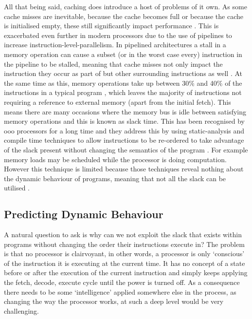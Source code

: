 All that being said, caching does introduce a host of problems of it own. As some cache misses are inevitable, because the cache becomes full or because the cache is initialised empty, these still significantly impact performance \cite{al-zoubiPerformanceEvaluationCache2004}. This is exacerbated even further in modern processors due to the use of pipelines to increase instruction-level-parallelism. In pipelined architectures a stall in a memory operation can cause a subset (or in the worst case every) instruction in the pipeline to be stalled, meaning that cache misses not only impact the instruction they occur as part of but other surrounding instructions as well \cite{pattersonComputerOrganizationDesign2018}. At the same time as this, memory operations take up between 30\% and 40\% of the instructions in a typical program \cite{bieniaPARSECBenchmarkSuite2008, limayeWorkloadCharacterizationSPEC2018}, which leaves the majority of instructions not requiring a reference to external memory (apart from the initial fetch). This means there are many occasions where the memory bus is idle between satisfying memory operations and this is known as slack time. This has been recognised by \gls{ooo} processors for a long time and they address this by using static-analysis and compile time techniques to allow instructions to be re-ordered to take advantage of the slack present without changing the semantics of the program \cite{hennessyComputerArchitectureQuantitative2019}. For example memory loads may be scheduled while the processor is doing computation. However this technique is limited because those techniques reveal nothing about the dynamic behaviour of programs, meaning that not all the slack can be utilised \cite{whithamTimePredictableOutofOrderExecution2010}. 

\subsection{Predicting Dynamic Behaviour}

A natural question to ask is why can we not exploit the slack that exists within programs without changing the order their instructions execute in? The problem is that no processor is clairvoyant, in other words, a processor is only `conscious' of the instruction it is executing at the current time. It has no concept of a state before or after the execution of the current instruction and simply keeps applying the fetch, decode, execute cycle until the power is turned off. As a consequence there needs to be some `intelligence' applied somewhere else in the process, as changing the way the processor works, at such a deep level would be very challenging.

